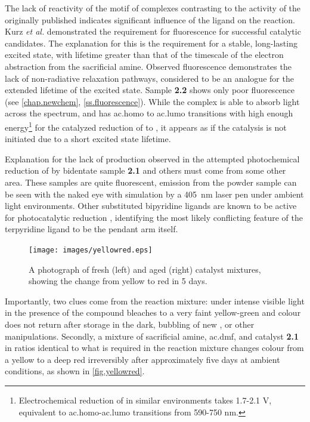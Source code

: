 The lack of reactivity of the  motif of complexes contrasting to the activity of the originally published  indicates significant influence of the ligand on the reaction. Kurz \textit{et al.} demonstrated the requirement for fluorescence for successful catalytic candidates\autocite{kurz2006}. The explanation for this is the requirement for a stable, long-lasting excited state, with lifetime greater than that of the timescale of the electron abstraction from the sacrificial amine. Observed fluorescence demonstrates the lack of non-radiative relaxation pathways, considered to be an analogue for the extended lifetime of the excited state. Sample \textbf{2.2} shows only poor fluorescence (see \autoref{chap.newchem}, \autoref{ss.fluorescence}). While the complex is able to absorb light across the spectrum, and has \gls{ac.homo} to \gls{ac.lumo} transitions with high enough energy\footnote{Electrochemical reduction of  in similar environments takes 1.7-2.1 V, equivalent to \gls{ac.homo}-\gls{ac.lumo} transitions from 590-750 nm\autocite{grills2014}.} for the catalyzed reduction of  to , it appears as if the catalysis is not initiated due to a short excited state lifetime.

Explanation for the lack of  production observed in the attempted photochemical reduction of  by bidentate sample \textbf{2.1} and others must come from some other area. These samples are quite fluorescent, emission from the powder sample can be seen with the naked eye with simulation by a 405~nm laser pen under ambient light environments. Other substituted bipyridine ligands are known to be active for photocatalytic reduction \autocite{hawecker1986, kurz2006}, identifying the most likely conflicting feature of the terpyridine ligand to be the pendant arm itself.

\begin{figure}[!htbp]
 \begin{center}
  \texttt{[image: images/yellowred.eps]}
 \end{center}
 \caption[A photograph of aged and fresh catalytic mixture.]{A photograph of fresh (left) and aged (right) catalyst mixtures, showing the change from yellow to red in 5 days.}
 \label{fig.yellowred}
\end{figure}

Importantly, two clues come from the reaction mixture: under intense visible light in the presence of  the compound bleaches to a very faint yellow-green and colour does not return after storage in the dark, bubbling of new , or other manipulations. Secondly, a mixture of sacrificial amine, \gls{ac.dmf}, and catalyst \textbf{2.1} in ratios identical to what is required in the reaction mixture changes colour from a yellow to a deep red irreversibly after approximately five days at ambient conditions, as shown in \autoref{fig.yellowred}. 

